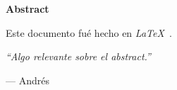 \begin{center}
\textbf{\large Abstract}
\end{center}


Este documento fu\'{e} hecho en \emph{\LaTeX\ }.

\vspace{1cm}

\emph{``Algo relevante sobre el abstract.''}

\hfill --- Andr\'{e}s
